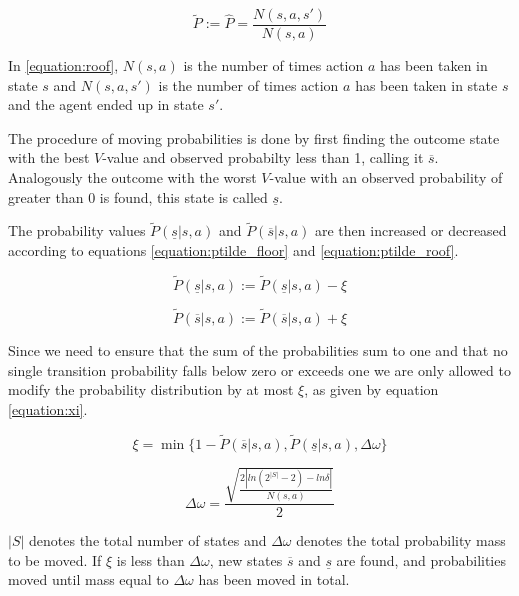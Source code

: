 \begin{equation}
\label{equation:roof}
\tilde{P} := \hat{P} = \frac{N(s,a,s')}{N(s,a)}
\end{equation}

In \eqref{equation:roof}, $N(s, a)$ is the number of times action $a$ has been taken in
state $s$ and $N(s, a, s')$ is the number of times action $a$ has been taken in
state $s$ and the agent ended up in state $s'$.

The procedure of moving probabilities is done by first finding the outcome
state with the best $V$-value and observed probabilty less than 1, calling it
$\overline{s}$. Analogously the outcome with the worst $V$-value with an
observed probability of greater than 0 is found, this state is called
$\underline{s}$. 

The probability values $\tilde{P}(\underline{s}|s,a)$ and
$\tilde{P}(\overline{s}|s,a)$ are then increased or decreased according to
equations \eqref{equation:ptilde_floor} and \eqref{equation:ptilde_roof}.

\begin{equation}
\label{equation:ptilde_floor}
\tilde{P}(\underline{s}|s,a) := \tilde{P}(\underline{s}|s,a)-\xi
\end{equation}

\begin{equation}
\label{equation:ptilde_roof}
\tilde{P}(\overline{s}|s,a) := \tilde{P}(\overline{s}|s,a)+\xi
\end{equation}

Since we need to ensure that the sum of the probabilities sum to one and that
no single transition probability falls below zero or exceeds one we are only
allowed to modify the probability distribution by at most $\xi$, as given by
equation \eqref{equation:xi}. 

\begin{equation}
\label{equation:xi}
\xi = \min\{
  1 - \tilde{P}(\overline{s} | s, a)
  , \tilde{P}(\underline{s} | s, a)
  , \Delta \omega 
\}
\end{equation}

\begin{equation}
  \Delta \omega = \frac{\sqrt{\frac{2|ln(2^{|S|}-2) - ln  \delta |}{N(s,a)}}}{2}
\end{equation}

$|S|$ denotes the total number of states and $\Delta \omega$ denotes the total
probability mass to be moved. If $\xi$ is less than $\Delta \omega$, new states
$\overline{s}$ and $\underline{s}$ are found, and probabilities moved until
mass equal to $\Delta \omega$ has been moved in total. 

